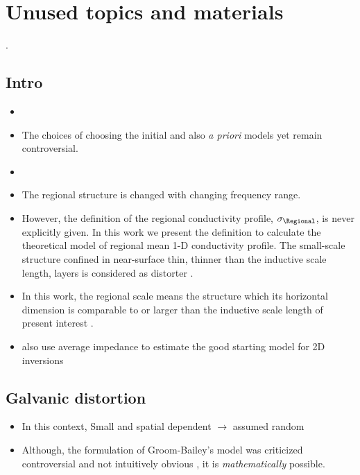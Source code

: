

\chapter{Unused topics and materials}
	.
	
	\section{Intro}
\begin{itemize}
	\item {}
	\item The choices of choosing the initial and also \emph{a priori} models yet remain controversial. 
	\item {}
	\item The regional structure is changed with changing frequency range.
	\item However, the definition of the regional conductivity profile, $\sigma_\Regional$, is never explicitly given. In this work we present the definition to calculate the theoretical model of regional mean 1-D conductivity profile.
		The small-scale structure confined in near-surface thin, thinner than the inductive scale length, layers is considered as distorter \citep{utada2000a}.
	\item In this work, the regional scale means the structure which its horizontal dimension is comparable to or larger than the inductive scale length of present interest \citep[also see][]{bahr1988a}. 
	\item \citet{tournerie2002a} also use average impedance to estimate the good starting model for 2D inversions	
\end{itemize}
	\section{Galvanic distortion}
	\begin{itemize}
		\item In this context, Small and spatial dependent  $\rightarrow$ assumed random 
		\item Although, the formulation of Groom-Bailey's model was criticized controversial and not intuitively obvious \citep{bibby2005a}, it is \emph{mathematically} possible.
	\end{itemize}	

